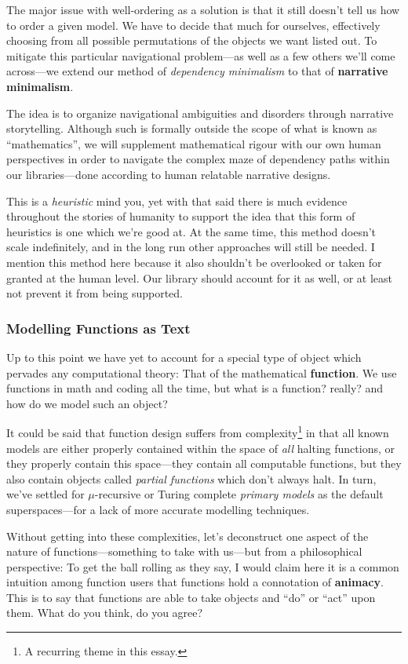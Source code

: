 \documentclass[twoside]{article}
\newcommand{\strong}[1]{{\bfseries #1}}
\begin{document}
The major issue with well-ordering as a solution is that it still doesn't tell us how to order a given model. We have
to decide that much for ourselves, effectively choosing from all possible permutations of the objects we want listed
out. To mitigate this particular navigational problem---as well as a few others we'll come across---we extend our method
of \emph{dependency minimalism} to that of \strong{narrative minimalism}.

The idea is to organize navigational ambiguities and disorders through narrative storytelling. Although such is formally outside
the scope of what is known as ``mathematics'', we will supplement mathematical rigour with our own human perspectives in order
to navigate the complex maze of dependency paths within our libraries---done according to human relatable narrative designs.

This is a \emph{heuristic} mind you, yet with that said there is much evidence throughout the stories of humanity to support
the idea that this form of heuristics is one which we're good at. At the same time, this method doesn't scale indefinitely,
and in the long run other approaches will still be needed. I mention this method here because it also shouldn't be overlooked
or taken for granted at the human level. Our library should account for it as well, or at least not prevent it from being
supported.

\subsubsection*{Modelling Functions as Text}

Up to this point we have yet to account for a special type of object which pervades any computational theory:
That of the mathematical \strong{function}. We use functions in math and coding all the time, but what is
a function? really? and how do we model such an object?

It could be said that function design suffers from complexity\footnote{A recurring theme in this essay.} in that all
known models are either properly contained within the space of \emph{all} halting functions, or they properly contain
this space---they contain all computable functions, but they also contain objects called \emph{partial functions} which
don't always halt. In turn, we've settled for $ \mu $-recursive or Turing complete \emph{primary models} as the default
superspaces---for a lack of more accurate modelling techniques.

Without getting into these complexities, let's deconstruct one aspect of the nature of functions---something to take with
us---but from a philosophical perspective: To get the ball rolling as they say, I would claim here it is a common intuition
among function users that functions hold a connotation of \strong{animacy}. This is to say that functions are able to take
objects and ``do'' or ``act'' upon them. What do you think, do you agree?
\end{document}
